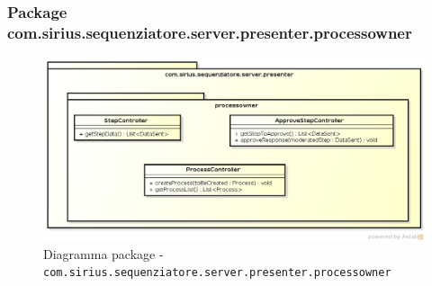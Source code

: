 \subsubsection{Package com.sirius.sequenziatore.server.presenter.processowner}
\begin{figure}[H] \centering \includegraphics[width=%
\textwidth]
{./classi/server/presenterprocessowner.png} \caption{Diagramma package - \texttt{com.sirius.sequenziatore.server.presenter.processowner}}
\end{figure}
